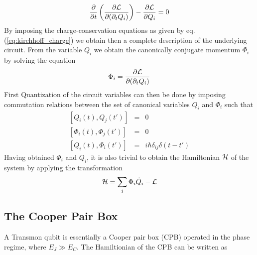 %
\begin{equation}
\frac{\partial}{\partial t}\left( \frac{\partial \begin{mathcal}L\end{mathcal}}{\partial(\partial_t Q_i)}\right)-\frac{\partial \begin{mathcal}L\end{mathcal}}{\partial Q_i} = 0
\end{equation}
%
By imposing the charge-conservation equations as given by eq. (\ref{eq:kirchhoff_charge}) we obtain then a complete description of the underlying circuit. From the variable $Q_i$ we obtain the canonically conjugate momentum $\Phi_i$ by solving the equation
%
\begin{equation}
\Phi_i = \frac{\partial \begin{mathcal}L\end{mathcal}}{\partial(\partial_t Q_i)}
\end{equation}
%
First Quantization of the circuit variables can then be done by imposing commutation relations between the set of canonical variables $Q_i$ and $\Phi_i$ such that
%
\begin{eqnarray}
\left[Q_i(t),Q_j(t')\right] & = & 0 \\
\left[\Phi_i(t),\Phi_j(t') \right] & = & 0 \\
\left[Q_i(t),\Phi_i(t')\right] & = & i\hbar\delta_{ij}\delta(t-t') \label{eq:quantization_commutation_relations}
\end{eqnarray}
%
Having obtained $\Phi_i$ and $Q_i$, it is also trivial to obtain the Hamiltonian $\begin{mathcal}H\end{mathcal}$ of the system by applying the transformation
%
\begin{equation}
\begin{mathcal}H\end{mathcal} = \sum\limits_j \Phi_i \dot{Q}_i - \begin{mathcal}L\end{mathcal}
\end{equation}
%
\subsection{The Cooper Pair Box}

A Transmon qubit is essentially a Cooper pair box (CPB) operated in the phase regime, where $E_J \gg E_C$. The Hamiltionian of the CPB can be written as \citep{cottet_implementation_2002}

